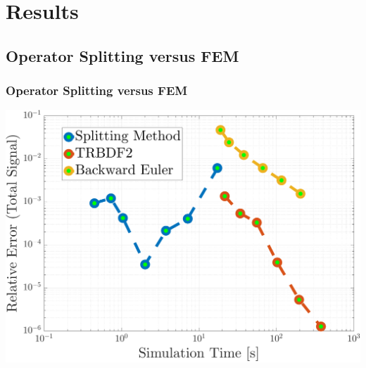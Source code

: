 \section{Results}

\subsection{Operator Splitting versus FEM}


\begin{frame}
\frametitle{Operator Splitting versus FEM}
\centering
\includegraphics[width=0.9\linewidth]{figures/error_curves}
\end{frame}

